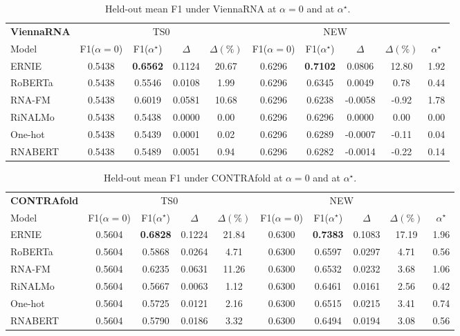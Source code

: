 \documentclass[logo,bsc,singlespacing,parskip]{infthesis}
\begin{document}
\begin{table}[H]
\centering
\small
\setlength{\tabcolsep}{3pt}
\caption{Held-out mean F1 under ViennaRNA at $\alpha=0$ and at $\alpha^\star$.}
\label{tab:alpha_vienna}
\begin{tabular}{lcccc cccc c}
\toprule
\textbf{ViennaRNA} & \multicolumn{4}{c}{TS0} & \multicolumn{4}{c}{NEW} & \\
\cmidrule(lr){2-5} \cmidrule(lr){6-9}
Model 
& F1($\alpha=0$) & F1($\alpha^\star$) & $\Delta$ & $\Delta(\%)$
& F1($\alpha=0$) & F1($\alpha^\star$) & $\Delta$ & $\Delta(\%)$ & $\alpha^\star$ \\
\midrule
ERNIE   & 0.5438 & \textbf{0.6562} & 0.1124 & 20.67 & 0.6296 & \textbf{0.7102} & 0.0806 & 12.80 & 1.92 \\
RoBERTa & 0.5438 & 0.5546 & 0.0108 & 1.99 & 0.6296 & 0.6345 & 0.0049 & 0.78 & 0.44 \\
RNA-FM   & 0.5438 & 0.6019 & 0.0581 & 10.68 & 0.6296 & 0.6238 & -0.0058 & -0.92 & 1.78 \\
RiNALMo & 0.5438 & 0.5438 & 0.0000 & 0.00 & 0.6296 & 0.6296 & 0.0000 & 0.00 & 0.00 \\
One-hot & 0.5438 & 0.5439 & 0.0001 & 0.02 & 0.6296 & 0.6289 & -0.0007 & -0.11 & 0.04 \\
RNABERT & 0.5438 & 0.5489 & 0.0051 & 0.94 & 0.6296 & 0.6282 & -0.0014 & -0.22 & 0.14 \\
\bottomrule
\end{tabular}
\end{table}
\vspace{-1.6em}
\begin{table}[H]
\centering
\small
\setlength{\tabcolsep}{3pt}
\caption{Held-out mean F1 under CONTRAfold at $\alpha=0$ and at $\alpha^\star$.}
\label{tab:alpha_contrafold}
\begin{tabular}{lcccc cccc c}
\toprule
\textbf{CONTRAfold} & \multicolumn{4}{c}{TS0} & \multicolumn{4}{c}{NEW} & \\
\cmidrule(lr){2-5} \cmidrule(lr){6-9}
Model 
& F1($\alpha=0$) & F1($\alpha^\star$) & $\Delta$ & $\Delta(\%)$
& F1($\alpha=0$) & F1($\alpha^\star$) & $\Delta$ & $\Delta(\%)$ & $\alpha^\star$ \\
\midrule
ERNIE   & 0.5604 & \textbf{0.6828} & 0.1224 & 21.84 & 0.6300 & \textbf{0.7383} & 0.1083 & 17.19 & 1.96 \\
RoBERTa & 0.5604 & 0.5868 & 0.0264 & 4.71 & 0.6300 & 0.6597 & 0.0297 & 4.71 & 0.56 \\
RNA-FM   & 0.5604 & 0.6235 & 0.0631 & 11.26 & 0.6300 & 0.6532 & 0.0232 & 3.68 & 1.06 \\
RiNALMo & 0.5604 & 0.5667 & 0.0063 & 1.12 & 0.6300 & 0.6461 & 0.0161 & 2.56 & 0.42 \\
One-hot & 0.5604 & 0.5725 & 0.0121 & 2.16 & 0.6300 & 0.6515 & 0.0215 & 3.41 & 0.74 \\
RNABERT & 0.5604 & 0.5790 & 0.0186 & 3.32 & 0.6300 & 0.6494 & 0.0194 & 3.08 & 0.56 \\
\bottomrule
\end{tabular}
\end{table}
\end{document}
